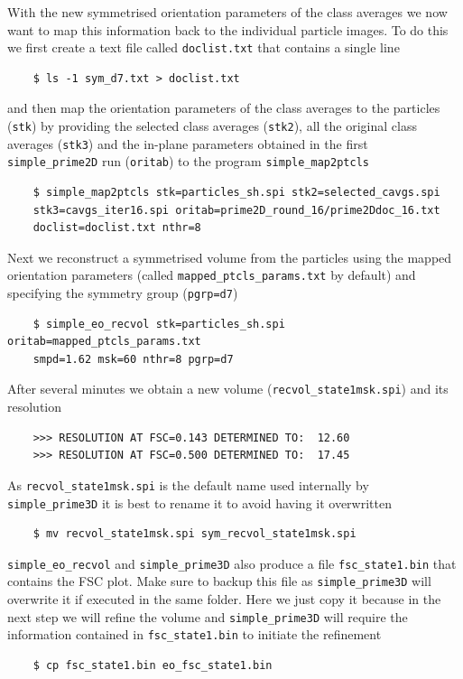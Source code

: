 \documentclass[a4paper,11pt]{article}
\newcommand{\prgname}[1]{\textcolor{NavyBlue}{\texttt{#1}}}
\begin{document}
With the new symmetrised orientation parameters of the class averages we now want to map this information back to the individual particle images. To do this we first create a text file called \texttt{doclist.txt} that contains a single line
\begin{verbatim}
    $ ls -1 sym_d7.txt > doclist.txt
\end{verbatim}
and then map the orientation parameters of the class averages to the particles (\texttt{stk}) by providing the selected class averages (\texttt{stk2}), all the original class averages (\texttt{stk3}) and the in-plane parameters obtained in the first \prgname{simple\_prime2D} run (\texttt{oritab}) to the program \prgname{simple\_map2ptcls}
\begin{verbatim}
    $ simple_map2ptcls stk=particles_sh.spi stk2=selected_cavgs.spi 
    stk3=cavgs_iter16.spi oritab=prime2D_round_16/prime2Ddoc_16.txt 
    doclist=doclist.txt nthr=8
\end{verbatim}
Next we reconstruct a symmetrised volume from the particles using the mapped orientation parameters (called \texttt{mapped\_ptcls\_params.txt} by default) and specifying the symmetry group (\texttt{pgrp=d7})
\begin{verbatim}
    $ simple_eo_recvol stk=particles_sh.spi oritab=mapped_ptcls_params.txt 
    smpd=1.62 msk=60 nthr=8 pgrp=d7
\end{verbatim}
After several minutes we obtain a new volume (\texttt{recvol\_state1msk.spi}) and its resolution
\begin{verbatim}
    >>> RESOLUTION AT FSC=0.143 DETERMINED TO:  12.60
    >>> RESOLUTION AT FSC=0.500 DETERMINED TO:  17.45
\end{verbatim}
As \texttt{recvol\_state1msk.spi} is the default name used internally by \prgname{simple\_prime3D} it is best to rename it to avoid having it overwritten
\begin{verbatim}
    $ mv recvol_state1msk.spi sym_recvol_state1msk.spi
\end{verbatim}
\prgname{simple\_eo\_recvol} and \prgname{simple\_prime3D} also produce a file \texttt{fsc\_state1.bin} that contains the FSC plot. Make sure to backup this file as  \prgname{simple\_prime3D} will overwrite it if executed in the same folder. Here we just copy it because in the next step we will refine the volume and  \prgname{simple\_prime3D}  will require the information contained in \texttt{fsc\_state1.bin} to initiate the refinement
\begin{verbatim}
    $ cp fsc_state1.bin eo_fsc_state1.bin
\end{verbatim}
\end{document}
